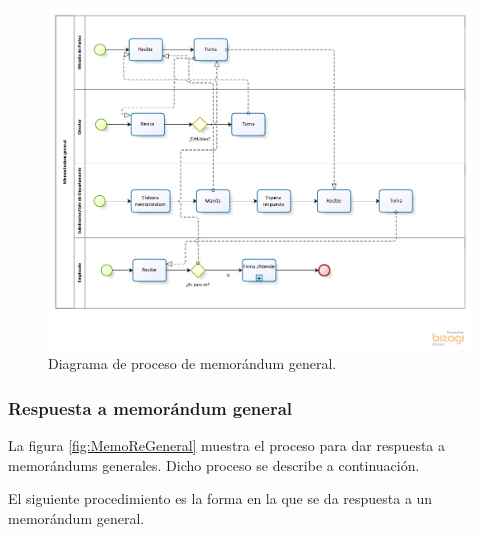 	\begin{figure}[htbp!]
		\centering
			\includegraphics[width=1.2\textwidth]{images/antecedentes/memogeneral}
		\caption{Diagrama de proceso de memorándum general.}
		\label{fig:MemoGeneral}
	\end{figure}
	
	\subsubsection{Respuesta a memorándum general}
	La figura \ref{fig:MemoReGeneral} muestra el proceso para dar respuesta a memorándums generales. Dicho proceso se describe a continuación.
		
	El siguiente procedimiento es la forma en la que se da respuesta a un memorándum general.
	
